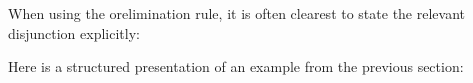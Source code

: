 \documentclass[letterpaper,10pt,english]{sphinxmanual}
\begin{document}
\sphinxAtStartPar
When using the or\sphinxhyphen{}elimination rule, it is often clearest to state the relevant disjunction explicitly:

\begin{sphinxVerbatim}[commandchars=\\\{\}]
         
       
 
  
    
    
\end{sphinxVerbatim}

\sphinxAtStartPar
Here is a \sphinxhyphen{}structured presentation of an example from the previous section:
\end{document}
